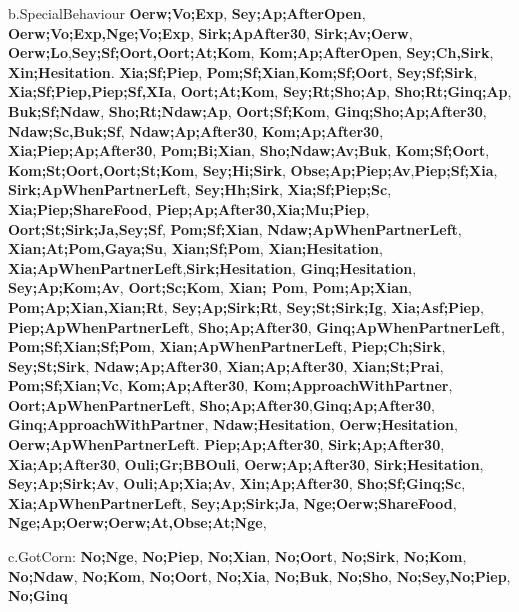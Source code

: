 \documentclass[
]{article}
\begin{document}
\begin{itemize}
  b.SpecialBehaviour \textbf{Oerw;Vo;Exp}, \textbf{Sey;Ap;AfterOpen},
  \textbf{Oerw;Vo;Exp,Nge;Vo;Exp}, \textbf{Sirk;ApAfter30},
  \textbf{Sirk;Av;Oerw},
  \textbf{Oerw;Lo},\textbf{Sey;Sf;Oort,Oort;At;Kom},
  \textbf{Kom;Ap;AfterOpen}, \textbf{Sey;Ch,Sirk},
  \textbf{Xin;Hesitation}. \textbf{Xia;Sf;Piep},
  \textbf{Pom;Sf;Xian},\textbf{Kom;Sf;Oort}, \textbf{Sey;Sf;Sirk},
  \textbf{Xia;Sf;Piep,Piep;Sf,XIa}, \textbf{Oort;At;Kom},
  \textbf{Sey;Rt;Sho;Ap}, \textbf{Sho;Rt;Ginq;Ap}, \textbf{Buk;Sf;Ndaw},
  \textbf{Sho;Rt;Ndaw;Ap}, \textbf{Oort;Sf;Kom},
  \textbf{Ginq;Sho;Ap;After30}, \textbf{Ndaw;Sc,Buk;Sf},
  \textbf{Ndaw;Ap;After30}, \textbf{Kom;Ap;After30},
  \textbf{Xia;Piep;Ap;After30}, \textbf{Pom;Bi;Xian},
  \textbf{Sho;Ndaw;Av;Buk}, \textbf{Kom;Sf;Oort},
  \textbf{Kom;St;Oort,Oort;St;Kom}, \textbf{Sey;Hi;Sirk},
  \textbf{Obse;Ap;Piep;Av},\textbf{Piep;Sf;Xia},
  \textbf{Sirk;ApWhenPartnerLeft}, \textbf{Sey;Hh;Sirk},
  \textbf{Xia;Sf;Piep;Sc}, \textbf{Xia;Piep;ShareFood},
  \textbf{Piep;Ap;After30,Xia;Mu;Piep}, \textbf{Oort;St;Sirk;Ja,Sey;Sf},
  \textbf{Pom;Sf;Xian}, \textbf{Ndaw;ApWhenPartnerLeft},
  \textbf{Xian;At;Pom,Gaya;Su}, \textbf{Xian;Sf;Pom},
  \textbf{Xian;Hesitation},
  \textbf{Xia;ApWhenPartnerLeft},\textbf{Sirk;Hesitation},
  \textbf{Ginq;Hesitation}, \textbf{Sey;Ap;Kom;Av},
  \textbf{Oort;Sc;Kom}, \textbf{Xian; Pom}, \textbf{Pom;Ap;Xian},
  \textbf{Pom;Ap;Xian,Xian;Rt}, \textbf{Sey;Ap;Sirk;Rt},
  \textbf{Sey;St;Sirk;Ig}, \textbf{Xia;Asf;Piep},
  \textbf{Piep;ApWhenPartnerLeft}, \textbf{Sho;Ap;After30},
  \textbf{Ginq;ApWhenPartnerLeft}, \textbf{Pom;Sf;Xian;Sf;Pom},
  \textbf{Xian;ApWhenPartnerLeft}, \textbf{Piep;Ch;Sirk},
  \textbf{Sey;St;Sirk}, \textbf{Ndaw;Ap;After30},
  \textbf{Xian;Ap;After30}, \textbf{Xian;St;Prai},
  \textbf{Pom;Sf;Xian;Vc}, \textbf{Kom;Ap;After30},
  \textbf{Kom;ApproachWithPartner}, \textbf{Oort;ApWhenPartnerLeft},
  \textbf{Sho;Ap;After30},\textbf{Ginq;Ap;After30},
  \textbf{Ginq;ApproachWithPartner}, \textbf{Ndaw;Hesitation},
  \textbf{Oerw;Hesitation}, \textbf{Oerw;ApWhenPartnerLeft}.
  \textbf{Piep;Ap;After30}, \textbf{Sirk;Ap;After30},
  \textbf{Xia;Ap;After30}, \textbf{Ouli;Gr;BBOuli},
  \textbf{Oerw;Ap;After30}, \textbf{Sirk;Hesitation},
  \textbf{Sey;Ap;Sirk;Av}, \textbf{Ouli;Ap;Xia;Av},
  \textbf{Xin;Ap;After30}, \textbf{Sho;Sf;Ginq;Sc},
  \textbf{Xia;ApWhenPartnerLeft}, \textbf{Sey;Ap;Sirk;Ja},
  \textbf{Nge;Oerw;ShareFood}, \textbf{Nge;Ap;Oerw;Oerw;At,Obse;At;Nge},

  c.GotCorn: \textbf{No;Nge}, \textbf{No;Piep}, \textbf{No;Xian},
  \textbf{No;Oort}, \textbf{No;Sirk}, \textbf{No;Kom}, \textbf{No;Ndaw},
  \textbf{No;Kom}, \textbf{No;Oort}, \textbf{No;Xia}, \textbf{No;Buk},
  \textbf{No;Sho}, \textbf{No;Sey,No;Piep}, \textbf{No;Ginq}


\end{itemize}
\end{document}
